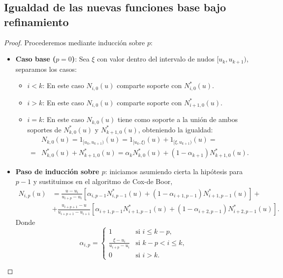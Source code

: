 \documentclass[11pt]{book}
\theoremstyle{plain} %
\theoremstyle{definition} %
\theoremstyle{definition} %
\begin{document}
\subsection{Igualdad de las nuevas funciones base bajo refinamiento}
\label{sec:dem_new_bases}
\begin{proof}
    Procederemos mediante inducción sobre $p$:
    \begin{itemize}
        \item \textbf{Caso base ($p=0$)}: Sea $\xi$ con valor dentro del intervalo de nudos $[u_k, u_{k+1})$, separamos los casos:
        \begin{itemize}
            \item $i < k$: En este caso $N_{i,0}(u)$ comparte soporte con $N^*_{i,0}(u)$.
            \item $i > k$: En este caso $N_{i,0}(u)$ comparte soporte con $N^*_{i+1,0}(u)$.
            \item $i = k$: En este caso $N_{k,0}(u)$ tiene como soporte a la unión de ambos soportes de $N^*_{k,0}(u)$ y $N^*_{k+1,0}(u)$, obteniendo la igualdad:
            \begin{align*}
                &N_{k,0}(u) = 1_{[u_k, u_{k+1})}(u) = 1_{[u_k, \xi)}(u) + 1_{[\xi, u_{k+1})}(u) =\\
                =&N^*_{k,0}(u) + N^*_{k+1,0}(u) = \alpha_k N^*_{k,0}(u) +(1-\alpha_{k+1}) N^*_{k+1,0}(u).
            \end{align*}
        \end{itemize}
        \item \textbf{Paso de inducción sobre $p$}: iniciamos asumiendo cierta la hipótesis para $p-1$ y sustituimos en el algoritmo de Cox-de Boor,
            \begin{align*}
                N_{i,p}(u) &= \frac{u - u_i}{u_{i+p} - u_i} \left[ \alpha_{i,p-1} N^*_{i,p-1}(u) + (1 - \alpha_{i+1,p-1}) N^*_{i+1,p-1}(u) \right]+ \\
                        &+ \frac{u_{i+p+1} - u}{u_{i+p+1} - u_{i+1}} \left[ \alpha_{i+1,p-1} N^*_{i+1,p-1}(u) + (1 - \alpha_{i+2,p-1}) N^*_{i+2,p-1}(u) \right].
            \end{align*}
            Donde $$\alpha_{i,p} = 
            \begin{cases} 
            1 & \text{si } i \le k - p ,\\
            \frac{\xi - u_i}{u_{i+p} - u_i} & \text{si } k - p < i \le k ,\\
            0 & \text{si } i > k.
            \end{cases}$$

\end{itemize}
\end{proof}
\end{document}
